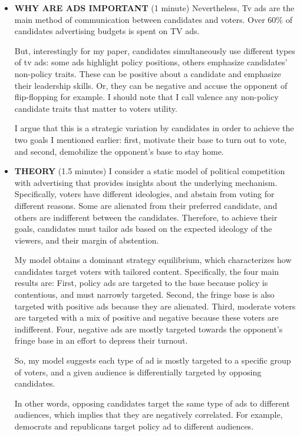 \documentclass[12pt]{article}
\theoremstyle{plain}
\theoremstyle{plain}
\theoremstyle{plain}
\theoremstyle{plain}
\theoremstyle{plain}
\theoremstyle{plain}
\begin{document}
\begin{itemize}
\item \textbf{WHY ARE ADS IMPORTANT} (1 minute)
Nevertheless, Tv ads are the main method of communication between candidates and voters.
Over 60\% of candidates advertising budgets is spent on TV ads.

But, interestingly for my paper, candidates simultaneously use different types of tv ads:
some ads highlight policy positions,
others emphasize candidates' non-policy traits. 
These can be positive about a candidate and emphasize their leadership skills.
Or, they can be negative and accuse the opponent of flip-flopping for example.
I should note that I call valence any non-policy candidate traits that matter to voters utility.

I argue that this is a strategic variation by candidates in order to achieve the two goals I mentioned earlier:
first, motivate their base to turn out to vote, and
second, demobilize the opponent's base to stay home.

\item \textbf{THEORY} (1.5 minutes)
I consider a static model of political competition with advertising that provides insights about the underlying mechanism.
Specifically, voters have different ideologies, and abstain from voting for different reasons.
Some are alienated from their preferred candidate, and others are indifferent between the candidates.
Therefore, to achieve their goals, candidates must tailor ads based on the expected ideology of the viewers, and their margin of abstention.

My model obtains a dominant strategy equilibrium, which characterizes how candidates target voters with tailored content.
Specifically, the four main results are:
First, policy ads are targeted to the base because policy is contentious, and must narrowly targeted.
Second, the fringe base is also targeted with positive ads because they are alienated.
Third, moderate voters are targeted with a mix of positive and negative because these voters are indifferent.
Four, negative ads are mostly targeted towards the opponent's fringe base in an effort to depress their turnout.

So, my model suggests each type of ad is mostly targeted to a specific group of voters, and a given audience is differentially targeted by opposing candidates.

In other words, opposing candidates target the same type of ads to different audiences, which implies that they are negatively correlated.
For example, democrats and republicans target policy ad to different audiences.


\end{itemize}
\end{document}
